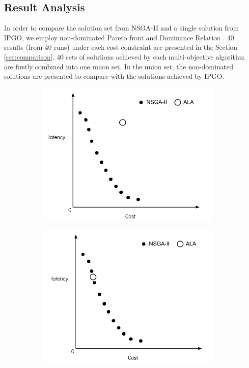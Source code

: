 \documentclass{llncs}
\begin{document}
\subsection{Result Analysis}
In order to compare the solution set from  NSGA-II and a single solution from IPGO, we employ non-dominated Pareto front
\cite{Xue} and Dominance Relation \cite{1688438}.
40 results (from 40 runs) under each cost constraint are presented in the Section \ref{sec:comparison}. 40 sets of solutions 
achieved by each multi-objective algorithm are firstly combined into one union set. In the union set, the non-dominated solutions 
are presented to compare with the solutions achieved by IPGO.

\begin{figure}[H]
	\centering
	\begin{subfigure}[b]{0.4\textwidth}
		\includegraphics[width=\textwidth]{pics/1.png}
		\caption{}
	\end{subfigure}
	\begin{subfigure}[b]{0.4\textwidth}
		\includegraphics[width=\textwidth]{pics/2.png}
		\caption{}
	\end{subfigure}



\end{figure}
\end{document}
